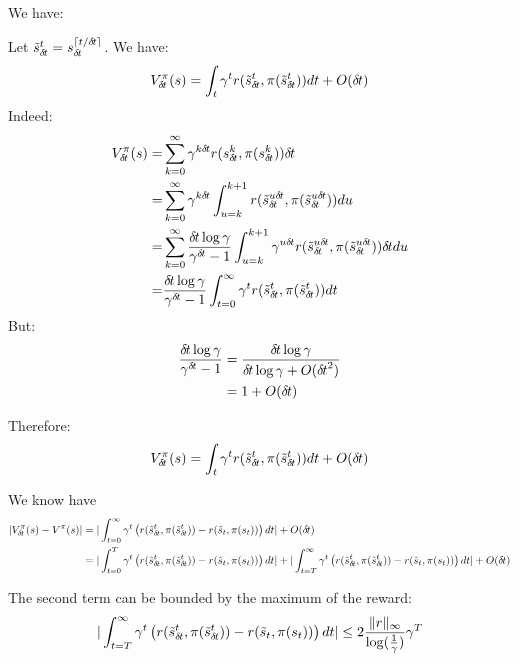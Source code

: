 
We have:

Let $\tilde s_{\delta\hspace{-.1em}t}^t = s_{\delta\hspace{-.1em}t}^{\lceil t/{\delta\hspace{-.1em}t}\rceil}$. We have:
\begin{align}
  V^\pi_{\delta\hspace{-.1em}t}(s) = \int_t \gamma^t r(\tilde s_{\delta\hspace{-.1em}t}^t, \pi(\tilde s_{\delta\hspace{-.1em}t}^t))dt + O({\delta\hspace{-.1em}t})
\end{align}
Indeed:
\begin{align}
  V^\pi_\deltat(s) =& \sum_{k=0}^\infty \gamma^{k\deltat}r(s_\deltat^k, \pi( s_\deltat^k))\deltat \\
  =& \sum_{k=0}^\infty \gamma^{k\deltat}\int_{u=k}^{k+1}r(\tilde s_\deltat^{u\deltat}, \pi( \tilde s_\deltat^{u\deltat}))du \\
  =& \sum_{k=0}^\infty \frac{\deltat \log \gamma}{\gamma^\deltat - 1}\int_{u=k}^{k+1}\gamma^{u\deltat}r(\tilde s_\deltat^{u\deltat}, \pi( \tilde s_\deltat^{u\deltat}))\deltat du \\
  =& \frac{\deltat \log \gamma}{\gamma^\deltat - 1}  \int_{t=0}^{\infty}\gamma^{t}r(\tilde s_\deltat^{t}, \pi( \tilde s_\deltat^{t}))dt \\
\end{align}
But:
\begin{align}
  \frac{{\delta\hspace{-.1em}t} \log \gamma}{\gamma^{\delta\hspace{-.1em}t} - 1} &= \frac{{\delta\hspace{-.1em}t} \log \gamma}{{\delta\hspace{-.1em}t} \log\gamma + O({\delta\hspace{-.1em}t}^2)} \\
  &= 1 +  O({\delta\hspace{-.1em}t}) \\
\end{align}

Therefore:
\begin{align}
  V^\pi_{\delta\hspace{-.1em}t}(s) = \int_t \gamma^t r(\tilde s_{\delta\hspace{-.1em}t}^t, \pi(\tilde s_{\delta\hspace{-.1em}t}^t))dt + O({\delta\hspace{-.1em}t})
\end{align}

We know have
\begin{align}
  |V^\pi_{\delta\hspace{-.1em}t}(s) - V^\pi(s)|  &= | \int_{t=0}^\infty\gamma^t \left(r(\tilde s_{\delta\hspace{-.1em}t}^t, \pi(\tilde s_{\delta\hspace{-.1em}t}^t)) - r(\tilde s_t, \pi(s_t)) \right)dt | + O({\delta\hspace{-.1em}t}) \\
  &= | \int_{t=0}^T\gamma^t \left(r(\tilde s_{\delta\hspace{-.1em}t}^t, \pi(\tilde s_{\delta\hspace{-.1em}t}^t)) - r(\tilde s_t, \pi(s_t)) \right)dt | + | \int_{t=T}^\infty\gamma^t \left(r(\tilde s_{\delta\hspace{-.1em}t}^t, \pi(\tilde s_{\delta\hspace{-.1em}t}^t)) - r(\tilde s_t, \pi(s_t)) \right)dt | + O({\delta\hspace{-.1em}t})
\end{align}

The second term can be bounded by the maximum of the reward:
\begin{align}
  | \int_{t=T}^\infty\gamma^t \left(r(\tilde s_{\delta\hspace{-.1em}t}^t, \pi(\tilde s_{\delta\hspace{-.1em}t}^t)) - r(\tilde s_t, \pi(s_t)) \right)dt | \leq 2 \frac{\|r\|_\infty}{\log(\frac{1}{\gamma})} \gamma^T
  \label{eq:v-firstpart}
\end{align}


